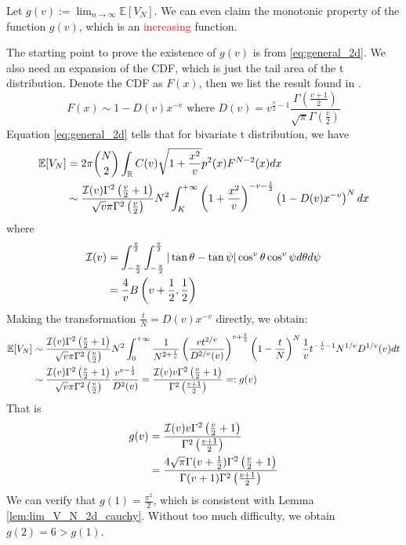 \documentclass{article}
\def\E{\mathbb{E}}
\def\R{\mathbb{R}}
\begin{document}
Let $g(v):=\lim_{n \to \infty} \E[V_N]$. We can even claim the monotonic property
of the function $g(v)$, which is an \textcolor{red}{increasing}
function.

The starting point to prove the existence of $g(v)$ 
is from \eqref{eq:general_2d}.
We also need an expansion of the CDF, which is just the tail area
of the t distribution. Denote the CDF as $F(x)$, then we list the result found in \cite{andrew1976}.
\begin{equation}
    F(x) \sim 1 - D(v)x^{-v} \textrm{ where } D(v)
    =v^{\frac{v}{2}-1} \frac{\Gamma \left(\frac{v+1}{2} \right)}
    {\sqrt{\pi} \Gamma\left(\frac{v}{2}\right)}
\end{equation}
Equation \eqref{eq:general_2d} tells that for bivariate t distribution,
we have
\begin{align}
    \E[V_N] & = 2\pi \binom{N}{2} \int_{\R}
    C(v) \sqrt{1+\frac{x^2}{v}} p^2(x)F^{N-2}(x)dx
    \notag \\
    &\sim \frac{ \mathcal{I}(v)\Gamma^2 \left(\frac{v}{2} +1\right) }
    {\sqrt{v}\pi
    \Gamma^2\left(\frac{v}{2}\right)}  N^2
    \int_{K}^{+\infty} \left(1+\frac{x^2}{v}\right)^{-v-\frac{1}{2}}
    \left(1-D(v)x^{-v} \right)^N dx
    \label{eq:v2bivariate_t_dis}
\end{align}
where
\begin{align}
    \mathcal{I}(v) &= \int_{-\frac{\pi}{2}}^{\frac{\pi}{2}}
    \int_{-\frac{\pi}{2}}^{\frac{\pi}{2}}
    |\tan \theta - \tan \psi|
    \cos^v\theta \cos^v \psi
    d\theta d\psi \notag\\
    &= \frac{4}{v} B\left(v+\frac{1}{2}, \frac{1}{2}
    \right)\label{eq:I_v_analytical}
\end{align}
Making the transformation $\frac{t}{N}=D(v)x^{-v}$
directly, we obtain:
\begin{align}\label{eq:EV_N_general}
    \E[V_N] &\sim
    \frac{ \mathcal{I}(v)
    \Gamma^2 \left(\frac{v}{2} +1\right) }
    {\sqrt{v}\pi
    \Gamma^2\left(\frac{v}{2}\right)}  N^2
    \int_{0}^{+\infty} \frac{1}{N^{2+\frac{1}{v}}}\left(\frac{vt^{2/v}}{D^{2/v}(v)}\right)^{v+\frac{1}{2}}
    \left(1- \frac{t}{N} \right)^N \frac{1}{v} t^{-\frac{1}{v}-1} N^{1/v} D^{1/v}(v)dt
    \\&\sim \frac{ \mathcal{I}(v)
    \Gamma^2 \left(\frac{v}{2} +1\right) }
    {\sqrt{v}\pi
    \Gamma^2\left(\frac{v}{2}\right)} \frac{v^{v-\frac{1}{2}}}
    {D^2(v)} = \frac{\mathcal{I}(v) v \Gamma^2\left(\frac{v}{2}+1\right)}
    {\Gamma^2 \left(\frac{v+1}{2} \right)} 
    =: g(v) \notag
\end{align}
That is
\begin{align}
    g(v) &= \frac{\mathcal{I}(v) v \Gamma^2\left(\frac{v}{2}+1\right)}
    {\Gamma^2 \left(\frac{v+1}{2} \right)} \notag \\
    &= \frac{4\sqrt{\pi}
    \Gamma(v+\frac{1}{2})\Gamma^2\left(\frac{v}{2}+1\right)}
    {\Gamma(v+1)\Gamma^2 \left(\frac{v+1}{2} \right)}
    \label{eq:def_g_v}
\end{align}
We can verify that $g(1) = \frac{\pi^2}{2}$,
which is consistent with Lemma \ref{lem:lim_V_N_2d_cauchy}.
Without too much difficulty, we obtain $g(2)=6>g(1)$.
\end{document}
